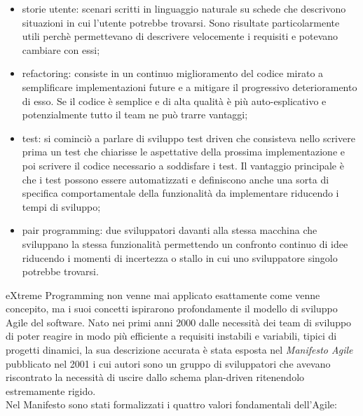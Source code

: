 \documentclass[target=bach,aauheader=,style=]{thud}
\begin{document}
\begin{itemize}
    \item storie utente: scenari scritti in linguaggio naturale su schede che descrivono situazioni in cui l'utente potrebbe trovarsi.
    Sono risultate particolarmente utili perchè permettevano di descrivere velocemente i requisiti e potevano cambiare con essi;
    \item refactoring: consiste in un continuo miglioramento del codice mirato a semplificare implementazioni future e a mitigare
    il progressivo deterioramento di esso. Se il codice è semplice e di alta qualità è più auto-esplicativo e potenzialmente tutto il
    team ne può trarre vantaggi;
    \item test: si cominciò a parlare di sviluppo test driven che consisteva nello scrivere prima un test che chiarisse le aspettative
    della prossima implementazione e poi scrivere il codice necessario a soddisfare i test. Il vantaggio principale è che i test possono
    essere automatizzati e definiscono anche una sorta di specifica comportamentale della funzionalità da implementare riducendo i tempi
    di sviluppo;
    \item pair programming: due sviluppatori davanti alla stessa macchina che sviluppano la stessa funzionalità permettendo un confronto
    continuo di idee riducendo i momenti di incertezza o stallo in cui uno sviluppatore singolo potrebbe trovarsi.
\end{itemize}
\par eXtreme Programming non venne mai applicato esattamente come venne concepito, ma i suoi concetti ispirarono profondamente il modello di sviluppo Agile del software.
Nato nei primi anni 2000 dalle necessità dei team di sviluppo di poter reagire in modo più efficiente a requisiti instabili e variabili, tipici di progetti dinamici,
la sua descrizione accurata è stata esposta nel \textit{Manifesto Agile}\cite{beck2001agile} pubblicato nel 2001 i cui
autori sono un gruppo di sviluppatori che avevano riscontrato la necessità di uscire dallo schema plan-driven ritenendolo estremamente rigido.\\
Nel Manifesto sono stati formalizzati i quattro valori fondamentali dell'Agile:
\end{document}
